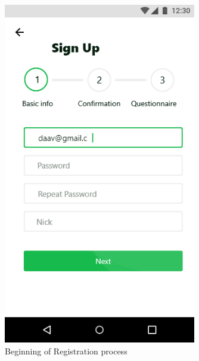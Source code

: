\documentclass[a4paper,11pt]{article} %
\begin{document}
\begin{figure}[h!]
  \centering
  \includegraphics[width=0.75\textwidth]{img/ui-wireframe/Sign-up.png}
  \caption{Beginning of Registration process}
\end{figure}
\end{document}
